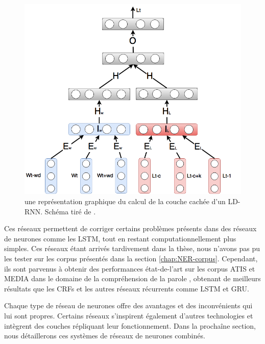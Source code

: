 \documentclass[12pt,a4paper,times,twoside,openright]{report}
\begin{document}
\begin{figure}[ht!]
    \centering
    \includegraphics[scale=0.3]{images/NN/LD-RNN/DeepLDRNN_2}
    \caption{une représentation graphique du calcul de la couche cachée d'un LD-RNN. Schéma tiré de \citet{dupont2017a}.}
    \label{fig:ht-computation}
\end{figure}

Ces réseaux permettent de corriger certains problèmes présents dans des réseaux de neurones comme les LSTM, tout en restant computationnellement plus simples. Ces réseaux étant arrivés tardivement dans la thèse, nous n'avons pas pu les tester sur les corpus présentés dans la section \ref{chap:NER-corpus}. Cependant, ils sont parvenus à obtenir des performances état-de-l'art sur les corpus ATIS et MEDIA dans le domaine de la compréhension de la parole \citep{dupont2017a,dinarelli2017modelisation}, obtenant de meilleurs résultats que les CRFs et les autres réseaux récurrents comme LSTM et GRU.

Chaque type de réseau de neurones offre des avantages et des inconvénients qui lui sont propres. Certains réseaux s'inspirent également d'autres technologies et intègrent des couches répliquant leur fonctionnement. Dans la prochaîne section, nous détaillerons ces systèmes de réseaux de neurones combinés.


        
\end{document}
